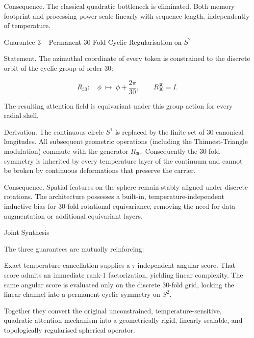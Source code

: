 Consequence.  
The classical quadratic bottleneck is eliminated. Both memory footprint and processing power scale linearly with sequence length, independently of temperature.

Guarantee 3 – Permanent 30-Fold Cyclic Regularisation on \(S^2\)

Statement.  
The azimuthal coordinate of every token is constrained to the discrete orbit of the cyclic group of order 30:

\[
R_{30}:\quad\phi\;\longmapsto\;\phi+\frac{2\pi}{30},\qquad R_{30}^{30}=I.
\]

The resulting attention field is equivariant under this group action for every radial shell.

Derivation.  
The continuous circle \(S^1\) is replaced by the finite set of 30 canonical longitudes. All subsequent geometric operations (including the Thinnest-Triangle modulation) commute with the generator \(R_{30}\). Consequently the 30-fold symmetry is inherited by every temperature layer of the continuum and cannot be broken by continuous deformations that preserve the carrier.

Consequence.  
Spatial features on the sphere remain stably aligned under discrete rotations. The architecture possesses a built-in, temperature-independent inductive bias for 30-fold rotational equivariance, removing the need for data augmentation or additional equivariant layers.

Joint Synthesis

The three guarantees are mutually reinforcing:

Exact temperature cancellation supplies a \(\tau\)-independent angular score.  
That score admits an immediate rank-1 factorization, yielding linear complexity.  
The same angular score is evaluated only on the discrete 30-fold grid, locking the linear channel into a permanent cyclic symmetry on \(S^2\).

Together they convert the original unconstrained, temperature-sensitive, quadratic attention mechanism into a geometrically rigid, linearly scalable, and topologically regularised spherical operator.
